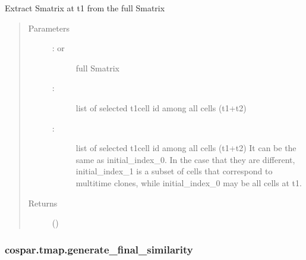 \documentclass[letterpaper,10pt,english]{sphinxmanual}
\begin{document}
\begin{fulllineitems}
\label{\detokenize{cospar.tmap.generate_initial_similarity:cospar.tmap.generate_initial_similarity}}
Extract Smatrix at t1 from the full Smatrix
\begin{quote}\begin{description}
\item[{Parameters}] \leavevmode\begin{description}
\item[{ :  or }] \leavevmode
full Smatrix

\item[{ : }] \leavevmode
list of selected t1\sphinxhyphen{}cell id among all cells (t1+t2)

\item[{ : }] \leavevmode
list of selected t1\sphinxhyphen{}cell id among all cells (t1+t2)
It can be the same as initial\_index\_0. In the case that they are different,
initial\_index\_1 is a subset of cells that correspond to multi\sphinxhyphen{}time clones,
while initial\_index\_0 may be all cells at t1.

\end{description}

\item[{Returns}] \leavevmode
{} ()

\end{description}\end{quote}

\end{fulllineitems}



\subsubsection{cospar.tmap.generate\_final\_similarity}
\label{\detokenize{cospar.tmap.generate_final_similarity:cospar-tmap-generate-final-similarity}}\label{\detokenize{cospar.tmap.generate_final_similarity::doc}}
\end{document}
